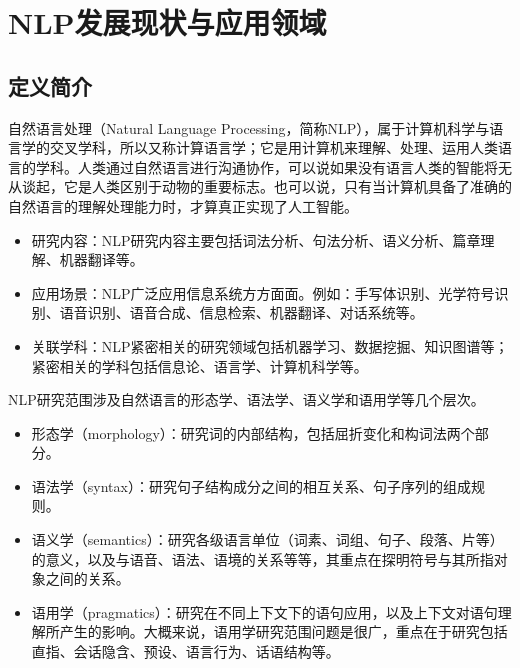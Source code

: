 %
%
%
\chapter{NLP发展现状与应用领域}
\label{basic} %

\section{定义简介}
自然语言处理（Natural Language Processing，简称NLP），属于计算机科学与语言学的交叉学科，所以又称计算语言学；它是用计算机来理解、处理、运用人类语言的学科。人类通过自然语言进行沟通协作，可以说如果没有语言人类的智能将无从谈起，它是人类区别于动物的重要标志。也可以说，只有当计算机具备了准确的自然语言的理解处理能力时，才算真正实现了人工智能。
\begin{itemize}
\item 研究内容：NLP研究内容主要包括词法分析、句法分析、语义分析、篇章理解、机器翻译等。
\item 应用场景：NLP广泛应用信息系统方方面面。例如：手写体识别、光学符号识别、语音识别、语音合成、信息检索、机器翻译、对话系统等。
\item 关联学科：NLP紧密相关的研究领域包括机器学习、数据挖掘、知识图谱等；紧密相关的学科包括信息论、语言学、计算机科学等。
\end{itemize}

NLP研究范围涉及自然语言的形态学、语法学、语义学和语用学等几个层次。
\begin{itemize}
\item 形态学（morphology）：研究词的内部结构，包括屈折变化和构词法两个部分。
\item 语法学（syntax）：研究句子结构成分之间的相互关系、句子序列的组成规则。
\item 语义学（semantics）：研究各级语言单位（词素、词组、句子、段落、片等）的意义，以及与语音、语法、语境的关系等等，其重点在探明符号与其所指对象之间的关系。
\item 语用学（pragmatics）：研究在不同上下文下的语句应用，以及上下文对语句理解所产生的影响。大概来说，语用学研究范围问题是很广，重点在于研究包括直指、会话隐含、预设、语言行为、话语结构等。
\end{itemize}

